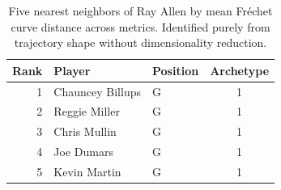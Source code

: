 \begin{table}[htbp]
  \centering\small
  \begin{tabular}{rllc}
    \toprule
    Rank & Player & Position & Archetype \\
    \midrule
    1 & Chauncey Billups & G & 1 \\
    2 & Reggie Miller & G & 1 \\
    3 & Chris Mullin & G & 1 \\
    4 & Joe Dumars & G & 1 \\
    5 & Kevin Martin & G & 1 \\
    \bottomrule
  \end{tabular}
  \caption{Five nearest neighbors of Ray Allen by mean Fr\'{e}chet curve distance across metrics. Identified purely from trajectory shape without dimensionality reduction.}
  \label{tab:Ray_Allen_frechet_curve_neighbors}
\end{table}

